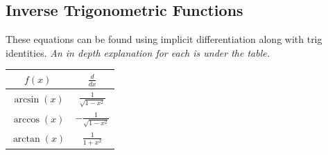 \documentclass[12pt]{article}
\begin{document}
        \subsection{Inverse Trigonometric Functions}
            These equations can be found using implicit differentiation along with trig identities. \textit{An in depth explanation for each is under the table.}
            \begin{center}
                \begin{tabular}{|c|c|}
                    \hline
                    $f(x)$ & $\frac{d}{dx}$ \\
                    \hline \hline
                    $\arcsin(x)$ & $\frac{1}{\sqrt{1-x^2}}$ \\
                    \hline
                    $\arccos(x)$ & $-\frac{1}{\sqrt{1-x^2}}$ \\
                    \hline
                    $\arctan(x)$ & $\frac{1}{1+x^2}$ \\
                    \hline
                \end{tabular}
            \end{center}
\end{document}

